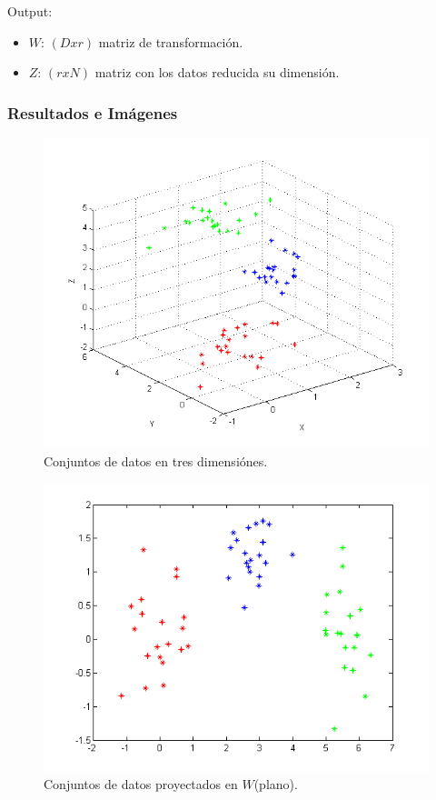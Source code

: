 Output:
	\begin{itemize}
	\item$W$: $(Dxr)$ matriz de transformación.\\
	\item$Z$: $(rxN)$ matriz con los datos reducida su dimensión.\\
	\end{itemize}
 
\subsubsection{Resultados e Imágenes}

\begin{figure}[ht!]
\centering
\includegraphics[width=120mm]{img/tp4/ej2-1.png}
\caption{Conjuntos de datos en tres dimensiónes.}
\end{figure}

\begin{figure}[ht!]
\centering
\includegraphics[width=120mm]{img/tp4/ej2-2.png}
\caption{Conjuntos de datos proyectados en $W$(plano).}
\end{figure}

